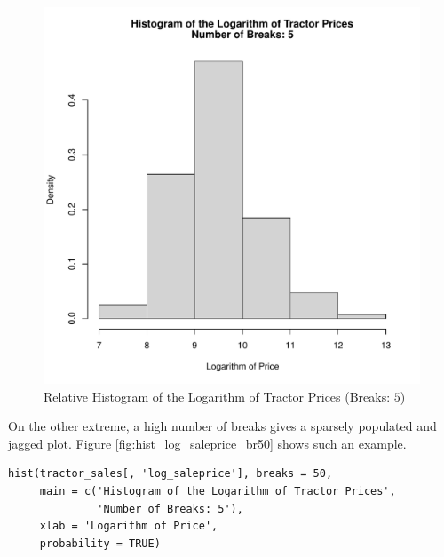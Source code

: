 \documentclass[11pt]{book}
\begin{document}
\begin{figure}[h!]
  \centering
  \includegraphics[scale = 0.5, keepaspectratio=true]{../Figures/hist_log_saleprice_br5}
  \caption{Relative Histogram of the Logarithm of Tractor Prices (Breaks: $5$)} \label{fig:hist_log_saleprice_br5}
\end{figure}

On the other extreme,
a high number of breaks gives a sparsely populated
and jagged plot.
Figure \ref{fig:hist_log_saleprice_br50}
shows such an example.

\begin{verbatim}
hist(tractor_sales[, 'log_saleprice'], breaks = 50,
     main = c('Histogram of the Logarithm of Tractor Prices',
              'Number of Breaks: 5'),
     xlab = 'Logarithm of Price',
     probability = TRUE)
\end{verbatim}
\end{document}
